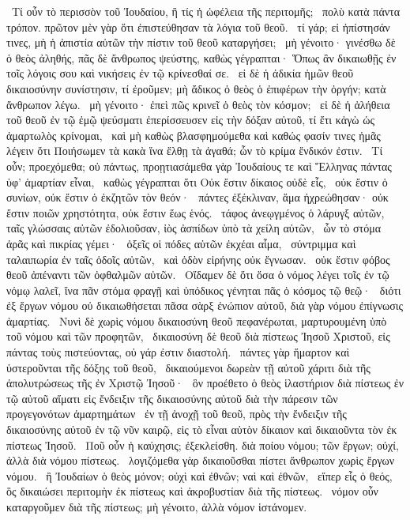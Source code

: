 ~Τί οὖν τὸ περισσὸν τοῦ Ἰουδαίου, ἢ τίς ἡ ὠφέλεια τῆς περιτομῆς;
~πολὺ κατὰ πάντα τρόπον. πρῶτον μὲν γὰρ ὅτι ἐπιστεύθησαν τὰ λόγια τοῦ θεοῦ.
~τί γάρ; εἰ ἠπίστησάν τινες, μὴ ἡ ἀπιστία αὐτῶν τὴν πίστιν τοῦ θεοῦ καταργήσει;
~μὴ γένοιτο· γινέσθω δὲ ὁ θεὸς ἀληθής, πᾶς δὲ ἄνθρωπος ψεύστης, καθὼς γέγραπται· Ὅπως ἂν δικαιωθῇς ἐν τοῖς λόγοις σου καὶ νικήσεις ἐν τῷ κρίνεσθαί σε.
~εἰ δὲ ἡ ἀδικία ἡμῶν θεοῦ δικαιοσύνην συνίστησιν, τί ἐροῦμεν; μὴ ἄδικος ὁ θεὸς ὁ ἐπιφέρων τὴν ὀργήν; κατὰ ἄνθρωπον λέγω.
~μὴ γένοιτο· ἐπεὶ πῶς κρινεῖ ὁ θεὸς τὸν κόσμον;
~εἰ δὲ ἡ ἀλήθεια τοῦ θεοῦ ἐν τῷ ἐμῷ ψεύσματι ἐπερίσσευσεν εἰς τὴν δόξαν αὐτοῦ, τί ἔτι κἀγὼ ὡς ἁμαρτωλὸς κρίνομαι,
~καὶ μὴ καθὼς βλασφημούμεθα καὶ καθώς φασίν τινες ἡμᾶς λέγειν ὅτι Ποιήσωμεν τὰ κακὰ ἵνα ἔλθῃ τὰ ἀγαθά; ὧν τὸ κρίμα ἔνδικόν ἐστιν.
~Τί οὖν; προεχόμεθα; οὐ πάντως, προῃτιασάμεθα γὰρ Ἰουδαίους τε καὶ Ἕλληνας πάντας ὑφ’ ἁμαρτίαν εἶναι,
~καθὼς γέγραπται ὅτι Οὐκ ἔστιν δίκαιος οὐδὲ εἷς,
~οὐκ ἔστιν ὁ συνίων, οὐκ ἔστιν ὁ ἐκζητῶν τὸν θεόν·
~πάντες ἐξέκλιναν, ἅμα ἠχρεώθησαν· οὐκ ἔστιν ποιῶν χρηστότητα, οὐκ ἔστιν ἕως ἑνός.
~τάφος ἀνεῳγμένος ὁ λάρυγξ αὐτῶν, ταῖς γλώσσαις αὐτῶν ἐδολιοῦσαν, ἰὸς ἀσπίδων ὑπὸ τὰ χείλη αὐτῶν,
~ὧν τὸ στόμα ἀρᾶς καὶ πικρίας γέμει·
~ὀξεῖς οἱ πόδες αὐτῶν ἐκχέαι αἷμα,
~σύντριμμα καὶ ταλαιπωρία ἐν ταῖς ὁδοῖς αὐτῶν,
~καὶ ὁδὸν εἰρήνης οὐκ ἔγνωσαν.
~οὐκ ἔστιν φόβος θεοῦ ἀπέναντι τῶν ὀφθαλμῶν αὐτῶν.
~Οἴδαμεν δὲ ὅτι ὅσα ὁ νόμος λέγει τοῖς ἐν τῷ νόμῳ λαλεῖ, ἵνα πᾶν στόμα φραγῇ καὶ ὑπόδικος γένηται πᾶς ὁ κόσμος τῷ θεῷ·
~διότι ἐξ ἔργων νόμου οὐ δικαιωθήσεται πᾶσα σὰρξ ἐνώπιον αὐτοῦ, διὰ γὰρ νόμου ἐπίγνωσις ἁμαρτίας.
~Νυνὶ δὲ χωρὶς νόμου δικαιοσύνη θεοῦ πεφανέρωται, μαρτυρουμένη ὑπὸ τοῦ νόμου καὶ τῶν προφητῶν,
~δικαιοσύνη δὲ θεοῦ διὰ πίστεως Ἰησοῦ Χριστοῦ, εἰς πάντας τοὺς πιστεύοντας, οὐ γάρ ἐστιν διαστολή.
~πάντες γὰρ ἥμαρτον καὶ ὑστεροῦνται τῆς δόξης τοῦ θεοῦ,
~δικαιούμενοι δωρεὰν τῇ αὐτοῦ χάριτι διὰ τῆς ἀπολυτρώσεως τῆς ἐν Χριστῷ Ἰησοῦ·
~ὃν προέθετο ὁ θεὸς ἱλαστήριον διὰ πίστεως ἐν τῷ αὐτοῦ αἵματι εἰς ἔνδειξιν τῆς δικαιοσύνης αὐτοῦ διὰ τὴν πάρεσιν τῶν προγεγονότων ἁμαρτημάτων
~ἐν τῇ ἀνοχῇ τοῦ θεοῦ, πρὸς τὴν ἔνδειξιν τῆς δικαιοσύνης αὐτοῦ ἐν τῷ νῦν καιρῷ, εἰς τὸ εἶναι αὐτὸν δίκαιον καὶ δικαιοῦντα τὸν ἐκ πίστεως Ἰησοῦ.
~Ποῦ οὖν ἡ καύχησις; ἐξεκλείσθη. διὰ ποίου νόμου; τῶν ἔργων; οὐχί, ἀλλὰ διὰ νόμου πίστεως.
~λογιζόμεθα γὰρ δικαιοῦσθαι πίστει ἄνθρωπον χωρὶς ἔργων νόμου.
~ἢ Ἰουδαίων ὁ θεὸς μόνον; οὐχὶ καὶ ἐθνῶν; ναὶ καὶ ἐθνῶν,
~εἴπερ εἷς ὁ θεός, ὃς δικαιώσει περιτομὴν ἐκ πίστεως καὶ ἀκροβυστίαν διὰ τῆς πίστεως.
~νόμον οὖν καταργοῦμεν διὰ τῆς πίστεως; μὴ γένοιτο, ἀλλὰ νόμον ἱστάνομεν.

